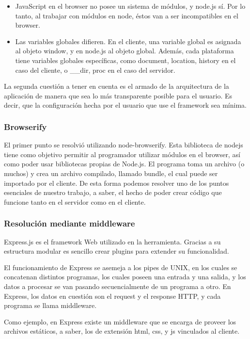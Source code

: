 \documentclass[doc,helv,longtable]{article}
\begin{document}
\begin{itemize}
\item  JavaScript en el browser no posee un sistema de módulos, y node.js sí. Por lo tanto, al trabajar con módulos en node, éstos van a ser incompatibles en el browser.  
\item  Las variables globales difieren. En el cliente, una variable global es asignada al objeto window, y en node.js al objeto global. Además, cada plataforma tiene variables globales específicas, como document, location, history en el caso del cliente, o \_\_dir, proc en el caso del servidor.

\end{itemize}


La segunda cuestión a tener en cuenta es el armado de la arquitectura de la aplicación de manera que sea lo más transparente posible para el usuario. Es decir, que la configuración hecha por el usuario que use el framework sea mínima.\subsubsection{Browserify}


El primer punto se resolvió utilizando node-browserify\cite{browserify}. Esta biblioteca de nodejs tiene como objetivo permitir al programador utilizar módulos en el browser, así como poder usar bibliotecas propias de Node.js. El programa toma un archivo (o muchos) y crea un archivo compilado, llamado bundle, el cual puede ser importado por el cliente. De esta forma podemos resolver uno de los puntos esenciales de nuestro trabajo, a saber, el hecho de poder crear código que funcione tanto en el servidor como en el cliente.\subsubsection{Resolución mediante middleware}


Express.js es el framework Web utilizado en la herramienta. Gracias a su estructura modular es sencillo crear plugins para extender su funcionalidad.

El funcionamiento de Express se asemeja a los pipes de UNIX, en los cuales se concatenan distintos programas, los cuales poseen una entrada y una salida, y los datos a procesar se van pasando secuencialmente de un programa a otro. En Express, los datos en cuestión son el request y el response HTTP, y cada programa se llama middleware.

Como ejemplo, en Express existe un middleware que se encarga de proveer los archivos estáticos, a saber, los de extensión html, css, y js vinculados al cliente.  
\end{document}
